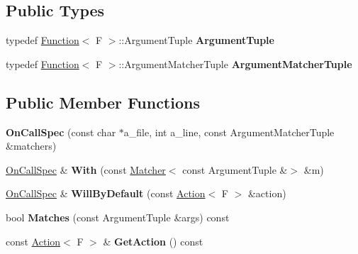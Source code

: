 \subsection*{Public Types}
\begin{DoxyCompactItemize}
\item 
\mbox{\label{classtesting_1_1internal_1_1_on_call_spec_a70ffab8b915b7b48a90f5ce256da806f}} 
typedef \hyperlink{structtesting_1_1internal_1_1_function}{Function}$<$ F $>$\+::Argument\+Tuple {\bfseries Argument\+Tuple}
\item 
\mbox{\label{classtesting_1_1internal_1_1_on_call_spec_a3240f159f0a9d8cda208bc256da35074}} 
typedef \hyperlink{structtesting_1_1internal_1_1_function}{Function}$<$ F $>$\+::Argument\+Matcher\+Tuple {\bfseries Argument\+Matcher\+Tuple}
\end{DoxyCompactItemize}
\subsection*{Public Member Functions}
\begin{DoxyCompactItemize}
\item 
\mbox{\label{classtesting_1_1internal_1_1_on_call_spec_ac7077e8162a10714e463b64a3cc7d054}} 
{\bfseries On\+Call\+Spec} (const char $\ast$a\+\_\+file, int a\+\_\+line, const Argument\+Matcher\+Tuple \&matchers)
\item 
\mbox{\label{classtesting_1_1internal_1_1_on_call_spec_a4d9152c0f74245670a1222aae2262d5e}} 
\hyperlink{classtesting_1_1internal_1_1_on_call_spec}{On\+Call\+Spec} \& {\bfseries With} (const \hyperlink{classtesting_1_1_matcher}{Matcher}$<$ const Argument\+Tuple \&$>$ \&m)
\item 
\mbox{\label{classtesting_1_1internal_1_1_on_call_spec_a1c6303bf46983f20f4d2a61752fa8663}} 
\hyperlink{classtesting_1_1internal_1_1_on_call_spec}{On\+Call\+Spec} \& {\bfseries Will\+By\+Default} (const \hyperlink{classtesting_1_1_action}{Action}$<$ F $>$ \&action)
\item 
\mbox{\label{classtesting_1_1internal_1_1_on_call_spec_a8113d1ec5775715637a87875dee6cc68}} 
bool {\bfseries Matches} (const Argument\+Tuple \&args) const
\item 
\mbox{\label{classtesting_1_1internal_1_1_on_call_spec_a3ef8e41380326823fb5b701f3c52cdb6}} 
const \hyperlink{classtesting_1_1_action}{Action}$<$ F $>$ \& {\bfseries Get\+Action} () const
\end{DoxyCompactItemize}
